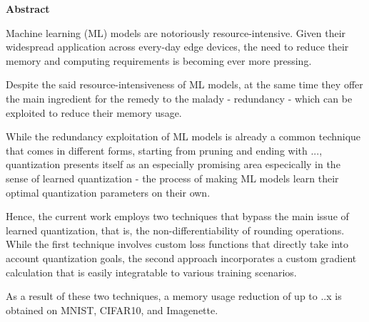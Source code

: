 \thispagestyle{empty}
\vspace*{1.0cm}

\begin{center}
    \textbf{Abstract} \label{abstract}
\end{center}

\vspace*{0.5cm}

Machine learning (ML) models are notoriously resource-intensive.
Given their widespread application across every-day edge devices,
the need to reduce their memory and computing requirements is becoming ever more pressing.

Despite the said resource-intensiveness of ML models, at the same time 
they offer the main ingredient for the remedy to the malady - redundancy - 
which can be exploited to reduce their memory usage.

While the redundancy exploitation of ML models is already a common 
technique that comes in different forms, starting from pruning and
ending with ..., quantization presents itself as an especially promising 
area especically in the sense of learned quantization - 
the process of making ML models learn their optimal quantization parameters
on their own.

Hence, the current work employs two techniques that bypass the main issue of learned quantization,
that is, the non-differentiability of rounding operations.
While the first technique involves custom loss functions that directly take into account
quantization goals, the second approach incorporates a custom gradient calculation that is
easily integratable to various training scenarios.

As a result of these two techniques, a memory usage reduction of up to ..x is obtained 
on MNIST, CIFAR10, and Imagenette. 

